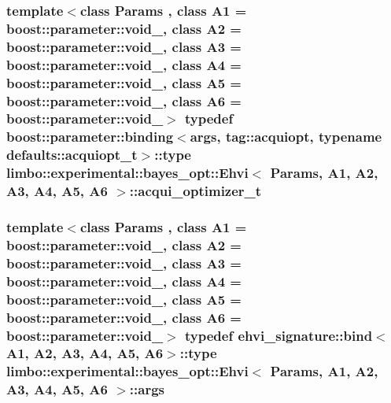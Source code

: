 \subsubsection[{acqui\+\_\+optimizer\+\_\+t}]{\setlength{\rightskip}{0pt plus 5cm}template$<$class Params , class A1  = boost\+::parameter\+::void\+\_\+, class A2  = boost\+::parameter\+::void\+\_\+, class A3  = boost\+::parameter\+::void\+\_\+, class A4  = boost\+::parameter\+::void\+\_\+, class A5  = boost\+::parameter\+::void\+\_\+, class A6  = boost\+::parameter\+::void\+\_\+$>$ typedef boost\+::parameter\+::binding$<${\bf args}, tag\+::acquiopt, typename {\bf defaults\+::acquiopt\+\_\+t}$>$\+::type {\bf limbo\+::experimental\+::bayes\+\_\+opt\+::\+Ehvi}$<$ Params, A1, A2, A3, A4, A5, A6 $>$\+::{\bf acqui\+\_\+optimizer\+\_\+t}}\label{classlimbo_1_1experimental_1_1bayes__opt_1_1_ehvi_a73568ce8f21582499102ca29a8ccbc68}
\hypertarget{classlimbo_1_1experimental_1_1bayes__opt_1_1_ehvi_ad5deb9cf89fe77464130cd2d400b5d7b}{}
\subsubsection[{args}]{\setlength{\rightskip}{0pt plus 5cm}template$<$class Params , class A1  = boost\+::parameter\+::void\+\_\+, class A2  = boost\+::parameter\+::void\+\_\+, class A3  = boost\+::parameter\+::void\+\_\+, class A4  = boost\+::parameter\+::void\+\_\+, class A5  = boost\+::parameter\+::void\+\_\+, class A6  = boost\+::parameter\+::void\+\_\+$>$ typedef ehvi\+\_\+signature\+::bind$<$A1, A2, A3, A4, A5, A6$>$\+::type {\bf limbo\+::experimental\+::bayes\+\_\+opt\+::\+Ehvi}$<$ Params, A1, A2, A3, A4, A5, A6 $>$\+::{\bf args}}\label{classlimbo_1_1experimental_1_1bayes__opt_1_1_ehvi_ad5deb9cf89fe77464130cd2d400b5d7b}
\hypertarget{classlimbo_1_1experimental_1_1bayes__opt_1_1_ehvi_ad0955fc65023479e48d85c50f1b2804d}{}

